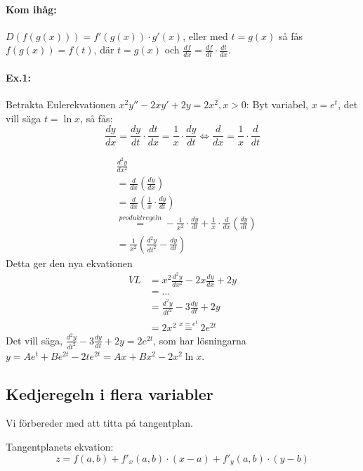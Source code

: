 \documentclass[a4paper,12pt]{article}
\begin{document}
\paragraph{Kom ihåg:} $D(f(g(x))) = f'(g(x)) \cdot g'(x)$, eller med $t = g(x)$
så fås $f(g(x)) = f(t)$, där $t = g(x)$ och $\frac{df}{dx} = \frac{df}{dt} \cdot
\frac{dt}{dx}$.

\paragraph{Ex.1:}
Betrakta Eulerekvationen $x^2y''-2xy'+2y = 2x^2,x>0$: Byt variabel, $x = e^t$,
det vill säga $t = \ln x$, så fås:
\begin{equation*}
  \frac{dy}{dx} = \frac{dy}{dt} \cdot \frac{dt}{dx} =
  \frac{1}{x} \cdot \frac{dy}{dt}
\Leftrightarrow
  \frac{d}{dx} = \frac{1}{x} \cdot \frac{d}{dt}
\end{equation*}

\begin{align*}
  & \frac{d^2y}{dx^2} \\
  & = \frac{d}{dx}\left(\frac{dy}{dx}\right) \\
  & = \frac{d}{dx}\left(\frac{1}{x} \cdot \frac{dy}{dt}\right) \\
  & \stackrel{produktregeln}{=} -\frac{1}{x^2} \cdot \frac{dy}{dt}
    + \frac{1}{x} \cdot \frac{d}{dx}\left(\frac{dy}{dt}\right) \\
  & = \frac{1}{x^2}\left(\frac{d^2y}{dt^2} - \frac{dy}{dt}\right)
\end{align*}
Detta ger den nya ekvationen
\begin{align*}
  VL & = x^2\frac{d^2y}{dx^2}-2x\frac{dy}{dx}+2y \\
     & = ... \\
     & = \frac{d^2y}{dt^2}-3\frac{dy}{dt}+2y \\
     & = 2x^2 \stackrel{x = e^t}{=} 2e^{2t}
\end{align*}
Det vill säga, $\frac{d^2y}{dt^2} - 3\frac{dy}{dt}+2y = 2e^{2t}$, som har
lösningarna $y = Ae^t+Be^{2t}-2te^{2t} = Ax+Bx^2-2x^2\ln x$.

\subsection{Kedjeregeln i flera variabler}
Vi förbereder med att titta på tangentplan.

Tangentplanets ekvation:
\begin{equation*}
  z = f(a,b) + f'_x(a,b)\cdot (x-a) + f'_y(a,b)\cdot (y-b)
\end{equation*}
\end{document}
